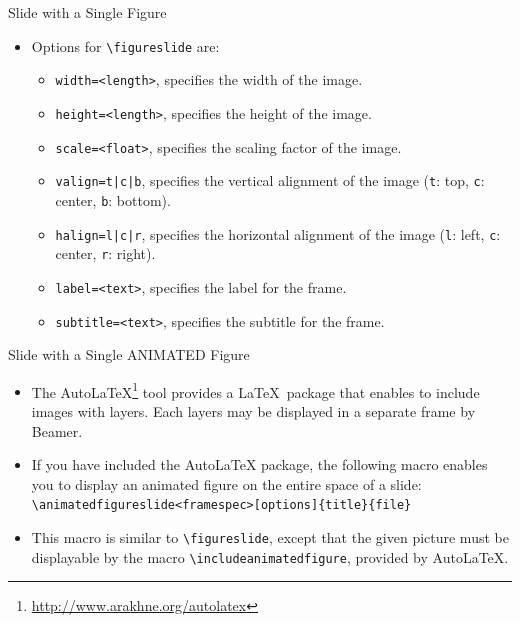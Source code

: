 \documentclass[english,sectioncirclenumberstyle]{le2iutbmbeamer}
\begin{document}
\begin{frame}{Slide with a Single Figure \insertcontinuationtext}
	\begin{itemize}
	\item Options for \texttt{{\textbackslash}figureslide} are:
		\begin{itemize}
		\item \texttt{width=<length>}, specifies the width of the image.
		\vfill
		\item \texttt{height=<length>}, specifies the height of the image.
		\vfill
		\item \texttt{scale=<float>}, specifies the scaling factor of the image.
		\vfill
		\item \texttt{valign=t|c|b}, specifies the vertical alignment of the image (\texttt{t}: top, \texttt{c}: center, \texttt{b}: bottom).
		\vfill
		\item \texttt{halign=l|c|r}, specifies the horizontal alignment of the image (\texttt{l}: left, \texttt{c}: center, \texttt{r}: right).
		\vfill
		\item \texttt{label=<text>}, specifies the label for the frame.
		\vfill
		\item \texttt{subtitle=<text>}, specifies the subtitle for the frame.
		\end{itemize}
	\end{itemize}
\end{frame}


\begin{frame}{Slide with a Single ANIMATED Figure}
	\begin{itemize}
	\item The AutoLaTeX\footnote{\url{http://www.arakhne.org/autolatex}} tool provides a \LaTeX\ package that enables to include images with layers. Each layers may be displayed in a separate frame by Beamer.
	\vfill
	\item If you have included the AutoLaTeX package, the following macro enables you to display an animated figure on the entire space of a slide: \\
		\texttt{{\textbackslash}animatedfigureslide<framespec>[options]\{title\}\{file\}}
	\item This macro is similar to \texttt{{\textbackslash}figureslide}, except that the given picture must be displayable by the macro \texttt{{\textbackslash}includeanimatedfigure}, provided by AutoLaTeX.
	\end{itemize}
\end{frame}
\end{document}
